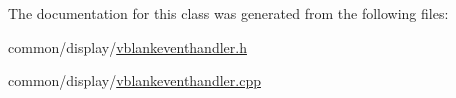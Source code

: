 The documentation for this class was generated from the following files\+:\begin{DoxyCompactItemize}
\item 
common/display/\mbox{\hyperlink{vblankeventhandler_8h}{vblankeventhandler.\+h}}\item 
common/display/\mbox{\hyperlink{vblankeventhandler_8cpp}{vblankeventhandler.\+cpp}}\end{DoxyCompactItemize}
